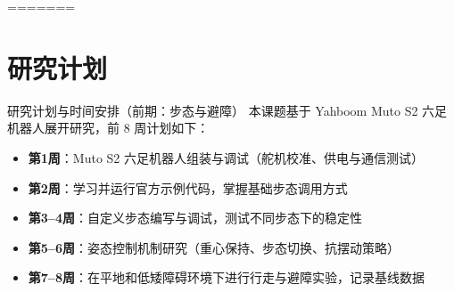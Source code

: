 \documentclass{beamer}
\begin{document}


%     
%     
=======

\section{研究计划}


\begin{frame}{研究计划与时间安排（前期：步态与避障）}
    本课题基于 Yahboom Muto S2 六足机器人展开研究，前 8 周计划如下：
    \begin{itemize}
        \item \textbf{第1周}：Muto S2 六足机器人组装与调试（舵机校准、供电与通信测试）
        \item \textbf{第2周}：学习并运行官方示例代码，掌握基础步态调用方式
        \item \textbf{第3--4周}：自定义步态编写与调试，测试不同步态下的稳定性
        \item \textbf{第5--6周}：姿态控制机制研究（重心保持、步态切换、抗摆动策略）
        \item \textbf{第7--8周}：在平地和低矮障碍环境下进行行走与避障实验，记录基线数据
    \end{itemize}
\end{frame}
\end{document}
